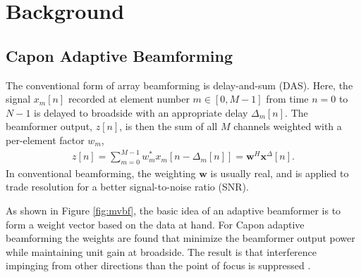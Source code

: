 \documentclass[conference]{IEEEtran}
\newcommand{\mat}[1]{\mathbf{#1}}
\renewcommand{\vec}[1]{\mathbf{#1}}
\begin{document}
\section{Background}
\subsection{Capon Adaptive Beamforming}
The conventional form of array beamforming is delay-and-sum (DAS). Here, the signal $x_m[n]$ recorded at element number $m \in [0,M-1]$ from time $n = 0$ to $N-1$ is delayed to broadside with an appropriate delay $\Delta_m[n]$. The beamformer output, $z[n]$, is then the sum of all $M$ channels weighted with a per-element factor $w_m$,
\begin{align}
z[n] = \sum_{m = 0}^{M-1}w_m^*x_m[n - \Delta_m[n]] = \vec{w}^H\vec{x}^{\Delta}[n]. \label{eq:z}
\end{align}
In conventional beamforming, the weighting $\vec{w}$ is usually real, and is applied to trade resolution for a better signal-to-noise ratio (SNR).

As shown in Figure \ref{fig:mvbf}, the basic idea of an adaptive beamformer is to form a weight vector based on the data at hand.  For Capon adaptive beamforming the weights are found that minimize the beamformer output power while maintaining unit gain at broadside. The result is that interference impinging from other directions than the point of focus is suppressed \cite{Synnevag2007}.

\end{document}
